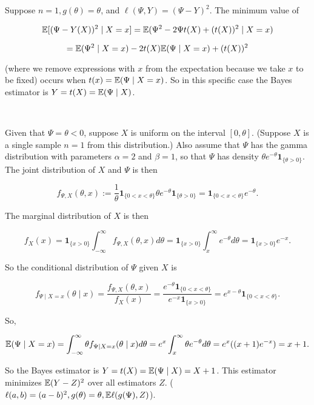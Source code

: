 \begin{example} Suppose \(n=1, g(\theta) = \theta\), and \(\ell(\Psi, Y) = (\Psi - Y)^2\). The minimum value of 


\[
\E[ (\Psi - Y(X))^2 \mid X = x] = \E( \Psi^2 - 2 \Psi t(X) + (t(X))^2 \mid X = x) 
\]

\[
= \E( \Psi^2 \mid X =x) - 2 t(X)\E(\Psi  \mid X =x)  + (t(X))^2 
\]

(where we remove expressions with \(x\) from the expectation because we take \(x\) to be fixed) occurs when \(t(x) = \E(\Psi \mid X = x)\). So in this specific case the Bayes estimator is \(Y =t (X) = \E(\Psi \mid X )\).

\

Given that \(\Psi = \theta < 0\), suppose \(X\) is uniform on the interval \([0, \theta]\). (Suppose \(X\) is a single sample \(n=1\) from this distribution.) Also assume that \(\Psi\) has the gamma distribution with parameters \(\alpha =2\) and \(\beta = 1\), so that \(\Psi\) has density \(\theta e^{-\theta} \boldsymbol{1}_{\{\theta > 0\}}\). The joint distribution of \(X\) and \(\Psi\) is then

\[
f_{\Psi, X}(\theta, x) := \frac{1}{\theta} \boldsymbol{1}_{\{0 < x < \theta\}} \theta e^{-\theta} \boldsymbol{1}_{\{\theta > 0\}} = \boldsymbol{1}_{\{0 < x < \theta\}} e^{-\theta}.
\]

The marginal distribution of \(X\) is then

\[
f_X(x) = \boldsymbol{1}_{\{x > 0 \}} \int_{-\infty}^\infty f_{\Psi, X}(\theta, x) d\theta =  \boldsymbol{1}_{\{x > 0 \}} \int_{x}^\infty e^{-\theta} d\theta =  \boldsymbol{1}_{\{x > 0 \}}e^{-x}.
\]

So the conditional distribution of \(\Psi\) given \(X\) is

\[
 f_{\Psi \mid X =x} (\theta \mid x) = \frac{f_{\Psi, X}(\theta, x)}{f_X(x)} = \frac{e^{-\theta} \boldsymbol{1}_{\{0 < x < \theta\}}}{e^{-x}\boldsymbol{1}_{\{x>0\}}} = e^{x-\theta} \boldsymbol{1}_{\{0 < x < \theta\}}.
\]

So,

\[
\E(\Psi \mid X =x) = \int_{-\infty}^\infty \theta f_{\Psi \mid X =x} (\theta \mid x) d \theta = e^x \int_x^\infty \theta e^{ -\theta} d \theta = e^x((x+1)e^{-x}) = x+1.
\]

So the Bayes estimator is \(Y = t(X) = \E(\Psi \mid X) = X + 1\). This estimator minimizes \(\E(Y-Z)^2\) over all estimators \(Z\). (\(\ell(a,b) = (a- b)^2, g(\theta) =\theta, \E \ell(g(\Psi), Z)\)).


\end{example}
